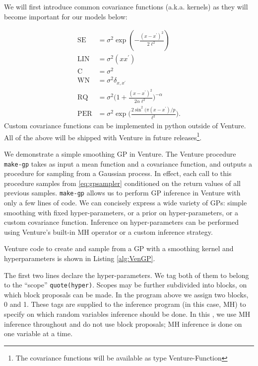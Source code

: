 We will first introduce common covariance functions (a.k.a. kernels) as they will become important for our models below:

\begin{align}
\text{SE} &= \sigma^2 \exp(-\frac{(x-x^\prime)^2}{2\ell^2}) \label{eq:SE}\\
\text{LIN} &=   \sigma^2(x x^\prime) \label{eq:LIN}\\
\text{C} &=   \sigma^2\label{eq:C}\\
\text{WN} &= \sigma^2 \delta_{x,x^\prime} \label{eq:WN} \\
\text{RQ} &=    \sigma^2 \bigg(1 + \frac{(x - x^\prime)^2}{2 \alpha \ell^2} \bigg)^{-\alpha} \label{eq:RQ} \\
\text{PER} &=  \sigma^2 \exp \bigg( \frac{2 \sin^2 ( \pi (x - x^\prime)/p}{\ell^2} \bigg). \label{eq:PER}
\end{align}
Custom covariance functions can be implemented in python outside of Venture. All of the above will be shipped with Venture in future releases\footnote{The covariance functions will be available as type Venture-Function}.

We demonstrate a simple smoothing \ac{GP} in Venture. The Venture procedure \texttt{make-gp} takes as input a mean function and a covariance function, and outputs a procedure for sampling from a Gaussian process.
In effect, each call to this procedure samples from \eqref{eq:gpsampler} conditioned on the return values of all previous samples.
\texttt{make-gp} allows us to perform GP inference in Venture with only a few lines of code.
We can concisely express a wide variety of GPs: simple smoothing with fixed hyper-parameters, or a prior on hyper-parameters, or a custom covariance function.
Inference on hyper-parameters can be performed using Venture's built-in MH operator or a custom inference strategy.

Venture code to create and sample from a GP with a smoothing kernel and hyperparameters is shown in Listing \ref{alg:VenGP}.




The first two lines declare the hyper-parameters.
We tag both of them to belong to the ``scope'' \texttt{quote(hyper)}.
Scopes may be further subdivided into blocks, on which block proposals can be made. In the program above we assign two blocks, 0 and 1. These tags are supplied to the inference program (in this case, MH) to specify on which random variables inference should be done. In this \paperOrChapter, we use MH inference throughout and do not use block proposals; MH inference is done on one variable at a time.

